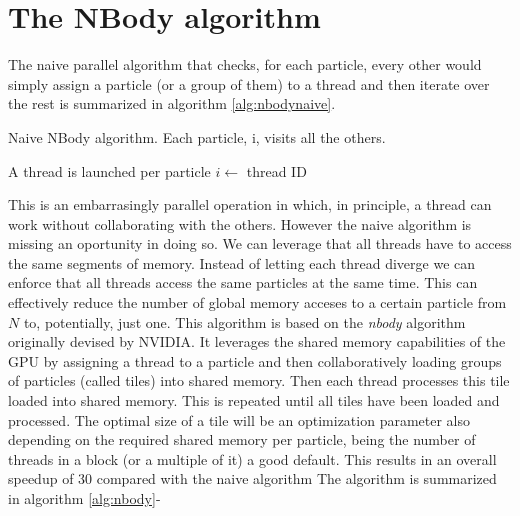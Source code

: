 \documentclass[ twoside,openright,titlepage,numbers=noenddot,%
headinclude,footinclude,cleardoublepage=empty,abstract=on,
BCOR=5mm,paper=a4,fontsize=11pt, dvipsnames
]{scrreprt}
\newcommand{\gpu}{\gls{GPU}\xspace}
\begin{document}
\section{The NBody algorithm}
The naive parallel algorithm that checks, for each particle, every other would simply assign a particle (or a group of them) to a thread and then iterate over the rest is summarized in algorithm \ref{alg:nbodynaive}.
\begin{algorithm}
  \caption{Naive NBody algorithm. Each particle, i, visits all the others.}\label{alg:nbodynaive}
  \begin{algorithmic}[1]
    \Require A thread is launched per particle    
    \State $i \gets$ thread ID 
    \EndFor
  \end{algorithmic}
\end{algorithm}
This is an embarrasingly parallel operation in which, in principle, a thread can work without collaborating with the others. However the naive algorithm is missing an oportunity in doing so. We can leverage that all threads have to access the same segments of memory. Instead of letting each thread diverge we can enforce that all threads access the same particles at the same time. This can effectively reduce the number of global memory acceses to a certain particle from $N$ to, potentially, just one.
This algorithm is based on the \emph{nbody} algorithm originally devised by NVIDIA\cite{nbody1,gpugems3,cudahandbook}. It leverages the shared memory capabilities of the \gpu by assigning a thread to a particle and then collaboratively loading groups of particles (called tiles) into shared memory. Then each thread processes this tile loaded into shared memory. This is repeated until all tiles have been loaded and processed.
The optimal size of a tile will be an optimization parameter also depending on the required shared memory per particle, being the number of threads in a block (or a multiple of it) a good default.
This results in an overall speedup of 30 compared with the naive algorithm 
The algorithm is summarized in algorithm \ref{alg:nbody}-
\end{document}
